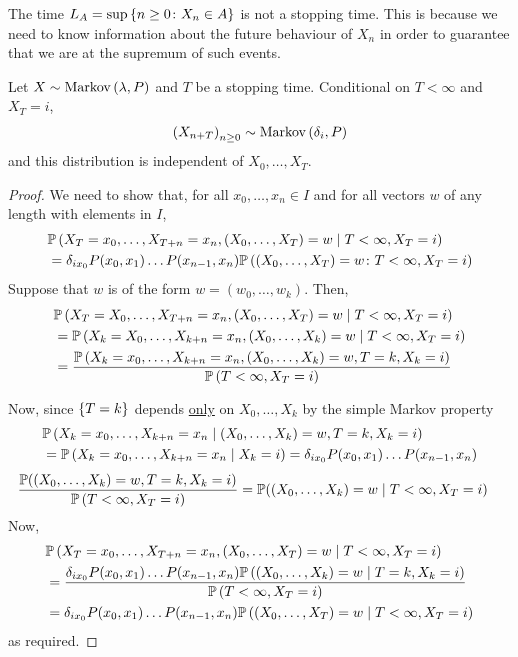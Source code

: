 \begin{example}
	The time $L_A = \sup \qty{n \geq 0 \colon X_n \in A}$ is not a stopping time.
	This is because we need to know information about the future behaviour of $X_n$ in order to guarantee that we are at the supremum of such events.
\end{example}
\begin{theorem}
	Let $X \sim \operatorname{Markov}\left({\lambda, P}\right)$ and $T$ be a stopping time.
	Conditional on $T < \infty$ and $X_T = i$,
	\begin{align*}
		\qty(X_{n + T})_{n \geq 0} \sim \operatorname{Markov}\left({\delta_i, P}\right)
	\end{align*}
	and this distribution is independent of $X_0, \dots, X_T$.
\end{theorem}
\begin{proof}
	We need to show that, for all $x_0, \dots, x_n \in I$ and for all vectors $w$ of any length with elements in $I$,
	\begin{align*}
		 & \mathbb{P}\left({X_T = x_0, \dots, X_{T+n} = x_n, (X_0, \dots, X_T) = w \mid T < \infty, X_T = i}\right)                    \\
		 & = \delta_{i x_0} P(x_0,x_1) \dots P(x_{n-1}, x_n) \mathbb{P}\left({(X_0, \dots, X_T) = w \colon T < \infty, X_T = i}\right)
	\end{align*}
	Suppose that $w$ is of the form $w = (w_0, \dots, w_k)$.
	Then,
	\begin{align*}
		 & \mathbb{P}\left({X_T = X_0, \dots, X_{T+n} = x_n, (X_0, \dots, X_T) = w \mid T < \infty, X_T = i}\right) \\
		 &= \mathbb{P}\left({X_k = X_0, \dots, X_{k+n} = x_n, (X_0, \dots, X_k) = w \mid T < \infty, X_T = i}\right) \\
		 & = \frac{\mathbb{P}\left({X_k = x_0, \dots, X_{k+n} = x_n, (X_0, \dots, X_k)=w, T=k,X_k=i}\right)}{\mathbb{P}\left({T < \infty, X_T = i}\right)}
	\end{align*}
	
	Now, since $\qty{T=k}$ depends \underline{only} on $X_0, \dots, X_k$ by the simple Markov property
	\begin{align*}
		 & \mathbb{P}\left({X_k = x_0, \dots, X_{k+n} = x_n \mid (X_0, \dots, X_k) = w, T = k, X_k = i}\right) \\
		 & = \mathbb{P}\left({X_k = x_0, \dots, X_{k+n} = x_n \mid X_k = i}\right) = \delta_{i x_0} P(x_0, x_1) \dots P(x_{n-1}, x_n)
	\end{align*}
	\begin{align*}
		\frac{\mathbb{P}((X_0, \dots, X_k) = w, T = k, X_k = i)}{\mathbb{P}\left({T < \infty, X_T = i}\right)} &= \mathbb{P}((X_0, \dots, X_k) = w \mid T < \infty, X_T = i)
	\end{align*} 
	Now,
	\begin{align*}
		 & \mathbb{P}\left({X_T = x_0, \dots, X_{T+n} = x_n, (X_0, \dots, X_T) = w \mid T < \infty, X_T = i}\right) \\
		 & = \frac{\delta_{i x_0} P(x_0,x_1) \dots P(x_{n-1}, x_n) \mathbb{P}\left({(X_0, \dots, X_k) = w \mid T = k, X_k = i}\right)}{\mathbb{P}\left({T < \infty, X_T = i}\right)} \\
		 & = \delta_{i x_0} P(x_0,x_1) \dots P(x_{n-1}, x_n) \mathbb{P}\left({(X_0, \dots, X_T) = w \mid T < \infty, X_T = i}\right)
	\end{align*}
	as required.
\end{proof}
